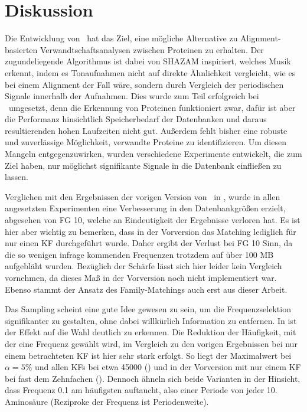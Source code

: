 \section{Diskussion} %
    \label{sec:diskussion}
    Die Entwicklung von \protfin\ hat das Ziel, eine mögliche Alternative zu Alignment-basierten Verwandtschaftsanalysen zwischen Proteinen zu erhalten. Der zugundeliegende Algorithmus ist dabei von SHAZAM inspiriert, welches Musik erkennt, indem es Tonaufnahmen nicht auf direkte Ähnlichkeit vergleicht, wie es bei einem Alignment der Fall wäre, sondern durch Vergleich der periodischen Signale innerhalb der Aufnahmen. Dies wurde zum Teil erfolgreich bei \protfin\ umgesetzt, denn die Erkennung von Proteinen funktioniert zwar, dafür ist aber die Performanz hinsichtlich Speicherbedarf der Datenbanken und daraus resultierenden hohen Laufzeiten nicht gut. Außerdem fehlt bisher eine robuste und zuverlässige Möglichkeit, verwandte Proteine zu identifizieren. Um diesen Mangeln entgegenzuwirken, wurden \NumWord{\theexperiment} verschiedene Experimente entwickelt, die zum Ziel haben, nur möglichst signifikante Signale in die Datenbank einfließen zu lassen.

    Verglichen mit den Ergebnissen der vorigen Version von \protfin\ in , wurde in allen angesetzten Experimenten eine Verbesserung in den Datenbankgrößen erzielt, abgesehen von \acf{FG} 10, welche an Eindeutigkeit der Ergebnisse verloren hat. Es ist hier aber wichtig zu bemerken, dass in der Vorversion das Matching lediglich für nur einen \acf{KF} durchgeführt wurde. Daher ergibt der Verlust bei \ac{FG} 10 Sinn, da die so wenigen infrage kommenden Frequenzen trotzdem auf über 100 \acs{MB} aufgebläht wurden. Bezüglich der Schärfe lässt sich hier leider kein Vergleich vornehmen, da dieses Maß in der Vorversion noch nicht implementiert war. Ebenso stammt der Ansatz des Family-Matchings auch erst aus dieser Arbeit.

    Das Sampling scheint eine gute Idee gewesen zu sein, um die Frequenzselektion signifikanter zu gestalten, ohne dabei willkürlich Information zu entfernen. In  ist der Effekt auf die Wahl deutlich zu erkennen. Die Reduktion der Häufigkeit, mit der eine Frequenz gewählt wird, im Vergleich zu den vorigen Ergebnissen bei nur einem betrachteten \ac{KF} ist hier sehr stark erfolgt. So liegt der Maximalwert bei $\alpha=5\%$ und allen \acp{KF} bei etwa 45000 () und in der Vorversion mit nur einem \ac{KF} bei fast dem Zehnfachen (). Dennoch ähneln sich beide Varianten in der Hinsicht, dass Frequenz 0.1 am häufigsten auftaucht, also einer Periode von jeder 10. Aminosäure (Reziproke der Frequenz ist Periodenweite).

